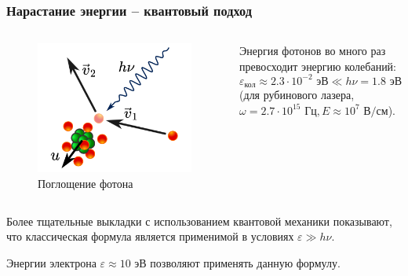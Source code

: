 \documentclass{beamer}
\begin{document}
	\begin{frame}
		\frametitle{Нарастание энергии -- квантовый подход}
		
		\begin{columns}
			\begin{figure}
				\centering
				\includegraphics[width=0.8\linewidth]{res/collision_with_recoil.png}
				\caption*{Поглощение фотона}
			\end{figure}
			
			Энергия фотонов во много раз превосходит энергию колебаний:
			$$\varepsilon_{\text{кол}} \approx 2.3\cdot 10^{-2} \text{ эВ} \ll h\nu = 1.8 \text{ эВ}$$
			(для рубинового лазера, $\omega = 2.7 \cdot 10^{15} \text{ Гц}, E \approx 10^7 \text{ В/см}$).
		\end{columns}
		
		Более тщательные выкладки с использованием квантовой механики показывают, что классическая формула является применимой в условиях $\varepsilon \gg h\nu$.

		Энергии электрона $\varepsilon \approx 10 \text{ эВ}$ позволяют применять данную формулу.
		
		
		
%		
%		
%		
	\end{frame}
	
\end{document}
